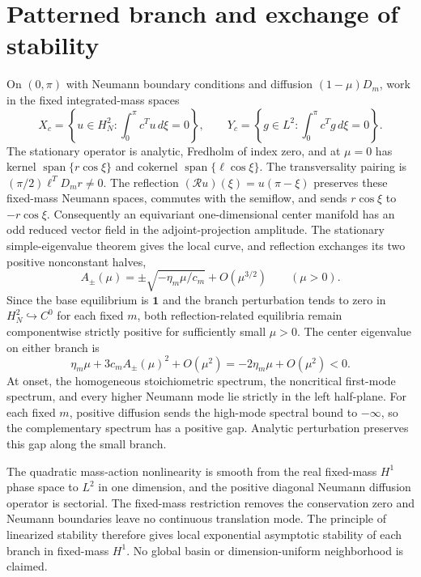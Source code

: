 \section*{Patterned branch and exchange of stability}
On $(0,\pi)$ with Neumann boundary conditions and diffusion
$(1-\mu)D_m$, work in the fixed integrated-mass spaces
\[
X_c=\left\{u\in H_N^2:\int_0^\pi c^Tu\,d\xi=0\right\},
\qquad
Y_c=\left\{g\in L^2:\int_0^\pi c^Tg\,d\xi=0\right\}.
\]
The stationary operator is analytic, Fredholm of index zero, and at
$\mu=0$ has kernel $\operatorname{span}\{r\cos\xi\}$ and cokernel
$\operatorname{span}\{\ell\cos\xi\}$.  The transversality pairing is
$(\pi/2)\ell^TD_mr\ne0$.  The reflection
$(\mathcal Ru)(\xi)=u(\pi-\xi)$ preserves these fixed-mass Neumann spaces,
commutes with the semiflow, and sends $r\cos\xi$ to $-r\cos\xi$.
Consequently an equivariant one-dimensional center manifold has an odd
reduced vector field in the adjoint-projection amplitude.  The stationary
simple-eigenvalue theorem gives the local curve, and reflection exchanges its
two positive nonconstant halves,
\[
A_\pm(\mu)=\pm\sqrt{-\eta_m\mu/c_m}+O(\mu^{3/2})
\qquad(\mu>0).
\]
Since the base equilibrium is $\mathbf1$ and the branch perturbation tends to
zero in $H_N^2\hookrightarrow C^0$ for each fixed $m$, both
reflection-related equilibria remain componentwise strictly positive for
sufficiently small $\mu>0$.
The center eigenvalue on either branch is
\[
\eta_m\mu+3c_mA_\pm(\mu)^2+O(\mu^2)
=-2\eta_m\mu+O(\mu^2)<0.
\]
At onset, the homogeneous stoichiometric spectrum, the noncritical first-mode
spectrum, and every higher Neumann mode lie strictly in the left half-plane.
For each fixed $m$, positive diffusion sends the high-mode spectral bound to
$-\infty$, so the complementary spectrum has a positive gap.  Analytic
perturbation preserves this gap along the small branch.

The quadratic mass-action nonlinearity is smooth from the real fixed-mass
$H^1$ phase space to $L^2$ in one dimension, and the positive diagonal
Neumann diffusion operator is sectorial.  The fixed-mass restriction removes
the conservation zero and Neumann boundaries leave no continuous translation
mode.  The principle of linearized stability therefore gives local exponential
asymptotic stability of each branch in fixed-mass $H^1$.  No global basin or
dimension-uniform neighborhood is claimed.
